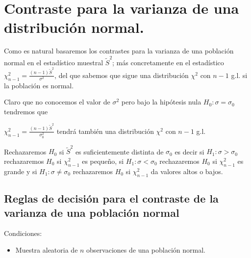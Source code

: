 \documentclass[12pt]{report}
\begin{document}
%
%  
%
%  
    \section{Contraste para la varianza de una distribución normal.}


    Como es natural basaremos los contrastes para la varianza de una
    población normal en el estadístico muestral $\tilde{S}^2$; más concretamente
    en el estadístico $\chi_{n-1}^2=\frac{(n-1) \tilde{S}^2}{\sigma^2}$,
    del que sabemos que sigue una  distribución $\chi^2$ con $n-1$ g.l.
    si la población es normal.

    Claro que no conocemos el valor de $\sigma^2$ pero bajo la hipótesis
    nula $H_{0}:\sigma=\sigma_{0}$  tendremos que

    $\chi_{n-1}^2=\frac{(n-1) \tilde{S}^2}{\sigma_{0}^2}$
    tendrá también una  distribución $\chi^2$ con $n-1$ g.l.

    Rechazaremos $H_{0}$ si $\tilde{S}^2$ es suficientemente distinta de
    $\sigma_{0}$ es decir si $H_{1}:\sigma>\sigma_{0}$ rechazaremos
    $H_{0}$ si $\chi_{n-1}^2$ es pequeño, si $H_{1}:\sigma<\sigma_{0}$
    rechazaremos
    $H_{0}$ si $\chi_{n-1}^2$ es grande y si $H_{1}:\sigma\not= \sigma_{0}$
    rechazaremos
    $H_{0}$ si $\chi_{n-1}^2$ da valores altos o bajos.



\subsection{Reglas de decisión para el contraste de la varianza de una población normal}
    Condiciones:

    \begin{itemize}
    \item Muestra aleatoria de $n$ observaciones de una población normal.
    \end{itemize}
\end{document}
